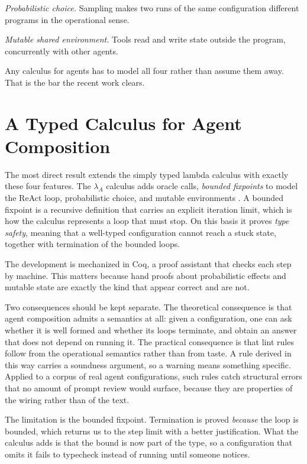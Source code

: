 \documentclass[11pt]{book}
\begin{document}
\textit{Probabilistic choice.} Sampling makes two runs of the same configuration different programs in the operational sense.

\textit{Mutable shared environment.} Tools read and write state outside the program, concurrently with other agents.

Any calculus for agents has to model all four rather than assume them away. That is the bar the recent work clears.

\section{A Typed Calculus for Agent Composition}

The most direct result extends the simply typed lambda calculus with exactly these four features. The $\lambda_A$ calculus adds oracle calls, \emph{bounded fixpoints} to model the ReAct loop, probabilistic choice, and mutable environments \cite{lambdaA2026}. A bounded fixpoint is a recursive definition that carries an explicit iteration limit, which is how the calculus represents a loop that must stop. On this basis it proves \emph{type safety}, meaning that a well-typed configuration cannot reach a stuck state, together with termination of the bounded loops.

The development is mechanized in Coq, a proof assistant that checks each step by machine. This matters because hand proofs about probabilistic effects and mutable state are exactly the kind that appear correct and are not.

Two consequences should be kept separate. The theoretical consequence is that agent composition admits a semantics at all: given a configuration, one can ask whether it is well formed and whether its loops terminate, and obtain an answer that does not depend on running it. The practical consequence is that lint rules follow from the operational semantics rather than from taste. A rule derived in this way carries a soundness argument, so a warning means something specific. Applied to a corpus of real agent configurations, such rules catch structural errors that no amount of prompt review would surface, because they are properties of the wiring rather than of the text.

The limitation is the bounded fixpoint. Termination is proved \textit{because} the loop is bounded, which returns us to the step limit with a better justification. What the calculus adds is that the bound is now part of the type, so a configuration that omits it fails to typecheck instead of running until someone notices.
\end{document}
